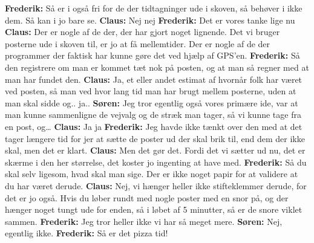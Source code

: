 \textbf{Frederik:} Så er i også fri for de der tidtagninger ude i skoven, så behøver i ikke dem. Så kan i jo bare se.\newline
\textbf{Claus:} Nej nej\newline
\textbf{Frederik:} Det er vores tanke lige nu\newline
\textbf{Claus:} Der er nogle af de der, der har gjort noget lignende. Det vi bruger posterne ude i skoven til, er jo at få mellemtider. Der er nogle af de der programmer der faktisk har kunne gøre det ved hjælp af GPS’en. \newline
\textbf{Frederik:} Så den registrere om man er kommet tæt nok på posten, og at man så regner med at man har fundet den.\newline
\textbf{Claus:} Ja, et eller andet estimat af hvornår folk har været ved posten, så man ved hvor lang tid man har brugt mellem posterne, uden at man skal sidde og.. ja..\newline
\textbf{Søren:} Jeg tror egentlig også vores primære ide, var at man kunne sammenligne de vejvalg og de stræk man tager, så vi kunne tage fra en post, og…\newline
\textbf{Claus:} Ja ja\newline
\textbf{Frederik:}  Jeg havde ikke tænkt over den med at det tager længere tid for jer at sætte de poster ud der skal brik til, end dem der ikke skal, men det er klart. \newline
\textbf{Claus:} Men det gør det. Fordi det vi sætter ud nu, det er skærme i den her størrelse, det koster jo ingenting at have med. \newline
\textbf{Frederik:}  Så du skal selv ligesom, hvad skal man sige. Der er ikke noget papir for at validere at du har været derude. \newline
\textbf{Claus:} Nej, vi hænger heller ikke stifteklemmer derude, for det er jo også. Hvis du løber rundt med nogle poster med en snor på, og der hænger noget tungt ude for enden, så i løbet af 5 minutter, så er de snore viklet sammen.\newline
\textbf{Frederik:} Jeg tror heller ikke vi har så meget mere.\newline
\textbf{Søren:} Nej, egentlig ikke.\newline
\textbf{Frederik:} Så er det pizza tid!\newline 

